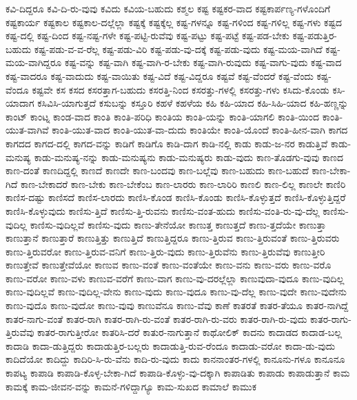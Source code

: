 {ಕವಿ-ದಿದ್ದರೂ
ಕವಿ-ದಿ-ರು-ವುವು
ಕವಿದು
ಕವಿಯ-ಬಹುದು
ಕಶ್ಮಲ
ಕಷ್ಟ
ಕಷ್ಟಕರ-ವಾದ
ಕಷ್ಟಕಾರ್ಪಣ್ಯ-ಗಳೊಂದಿಗೆ
ಕಷ್ಟಕಾರ್ಯ
ಕಷ್ಟಕಾಲ
ಕಷ್ಟಕಾಲ-ದಲ್ಲೆಲ್ಲಾ
ಕಷ್ಟಕ್ಕೆ
ಕಷ್ಟಕ್ಕೆಲ್ಲ
ಕಷ್ಟ-ಗಳನ್ನೂ
ಕಷ್ಟ-ಗಳಿಂದ
ಕಷ್ಟ-ಗಳಿಲ್ಲ
ಕಷ್ಟ-ಗಳು
ಕಷ್ಟದ
ಕಷ್ಟ-ದಲ್ಲಿ
ಕಷ್ಟ-ದಿಂದ
ಕಷ್ಟ-ನಷ್ಟ-ಗಳೇ
ಕಷ್ಟ-ಪಟ್ಟಿ-ರುವೆವು
ಕಷ್ಟ-ಪಟ್ಟು
ಕಷ್ಟ-ಪಟ್ಟೆ
ಕಷ್ಟ-ಪಡ-ಬೇಕು
ಕಷ್ಟ-ಪಡುತ್ತಿರ-ಬಹುದು
ಕಷ್ಟ-ಪಡು-ವ-ವ-ರೆಲ್ಲ
ಕಷ್ಟ-ಪಡು-ವಿರಿ
ಕಷ್ಟ-ಪಡು-ವು-ದಕ್ಕೆ
ಕಷ್ಟ-ಪಡು-ವುದು
ಕಷ್ಟ-ಮಯ-ವಾಗಿದೆ
ಕಷ್ಟ-ಮಯ-ವಾಗಿದ್ದರೂ
ಕಷ್ಟ-ವನ್ನು
ಕಷ್ಟ-ವಾಗಿ
ಕಷ್ಟ-ವಾಗಿ-ರ-ಬೇಕು
ಕಷ್ಟ-ವಾಗಿ-ರುವುದು
ಕಷ್ಟ-ವಾಗು-ವುದು
ಕಷ್ಟ-ವಾದ
ಕಷ್ಟ-ವಾದರೂ
ಕಷ್ಟ-ವಾದುದು
ಕಷ್ಟ-ವಾಯಿತು
ಕಷ್ಟ-ವಿದೆ
ಕಷ್ಟ-ವಿದ್ದರೂ
ಕಷ್ಟವೆ
ಕಷ್ಟ-ವೆಂದರೆ
ಕಷ್ಟ-ವೆಂದು
ಕಷ್ಟ-ವೆಂದೂ
ಕಷ್ಟವೇ
ಕಸ
ಕಸದ
ಕಸರತ್ತಾಗ-ಬಹುದು
ಕಸರತ್ತಿ-ನಿಂದ
ಕಸರತ್ತು-ಗಳಲ್ಲಿ
ಕಸರತ್ತು-ಗಳು
ಕಸಿದು-ಕೊಂಡು
ಕಸಿ-ಯಾದಾಗ
ಕಸಿವಿಸಿ-ಯಾಗುತ್ತದೆ
ಕಸುಬನ್ನು
ಕಸ್ತೂರಿ
ಕಹಳೆ
ಕಹಳೆಯ
ಕಹಿ
ಕಹಿ-ಯಾದ
ಕಹಿ-ಸಿಹಿ-ಯಾದ
ಕಹಿ-ಹಣ್ಣನ್ನು
ಕಾಂಟ್
ಕಾಂಟ್ನ
ಕಾಂಡ-ವಾದ
ಕಾಂತಿ
ಕಾಂತಿ-ಪರಿಧಿ
ಕಾಂತಿಯ
ಕಾಂತಿ-ಯನ್ನು
ಕಾಂತಿ-ಯಾಗಲಿ
ಕಾಂತಿ-ಯಿಂದ
ಕಾಂತಿ-ಯುತ-ವಾಗಿವೆ
ಕಾಂತಿ-ಯುತ-ವಾದ
ಕಾಂತಿ-ಯುತ-ವಾ-ದುದು
ಕಾಂತಿಯೇ
ಕಾಂತಿ-ಯೊಂದೆ
ಕಾಂತಿ-ಹೀನ-ವಾಗಿ
ಕಾಗದ
ಕಾಗದದ
ಕಾಗದ-ದಲ್ಲಿ
ಕಾಗದ-ವನ್ನು
ಕಾಡಿಗೆ
ಕಾಡಿಗೊ
ಕಾಡಿ-ದಾಗ
ಕಾಡಿ-ನಲ್ಲಿ
ಕಾಡು
ಕಾಡು-ಜ-ನರ
ಕಾಡುತ್ತಿವೆ
ಕಾಡು-ಮನುಷ್ಯ
ಕಾಡು-ಮನುಷ್ಯ-ನನ್ನು
ಕಾಡು-ಮನುಷ್ಯನು
ಕಾಡು-ಮನುಷ್ಯರು
ಕಾಡು-ವುದು
ಕಾಣ-ತೊಡಗು-ವುವು
ಕಾಣದ
ಕಾಣ-ದಂತೆ
ಕಾಣದಿದ್ದಲ್ಲಿ
ಕಾಣದೆ
ಕಾಣದೇ
ಕಾಣ-ಬಂದವು
ಕಾಣ-ಬಲ್ಲೆವು
ಕಾಣ-ಬಹುದು
ಕಾಣ-ಬಹುದೆ
ಕಾಣ-ಬೇಕಾ-ಗಿದೆ
ಕಾಣ-ಬೇಕಾದರೆ
ಕಾಣ-ಬೇಕು
ಕಾಣ-ಬೇಕೆಂಬ
ಕಾಣ-ಲಾರರು
ಕಾಣ-ಲಾರಿರಿ
ಕಾಣಲಿ
ಕಾಣ-ಲಿಲ್ಲ
ಕಾಣಲೇ
ಕಾಣಿರಿ
ಕಾಣಿಸ-ದಷ್ಟು
ಕಾಣಿಸದೆ
ಕಾಣಿಸ-ಲಾರದು
ಕಾಣಿಸಿ-ಕೊಂಡ
ಕಾಣಿಸಿ-ಕೊಂಡು
ಕಾಣಿಸಿ-ಕೊಳ್ಳುತ್ತದೆ
ಕಾಣಿಸಿ-ಕೊಳ್ಳುತ್ತಿದ್ದರೆ
ಕಾಣಿಸಿ-ಕೊಳ್ಳುವುದು
ಕಾಣಿಸು-ತ್ತಿದೆ
ಕಾಣಿಸು-ತ್ತಿ-ರುವನು
ಕಾಣಿಸು-ವಂತ-ಹುದು
ಕಾಣಿಸು-ವಂತಿ-ರು-ವು-ದೆಲ್ಲ
ಕಾಣಿಸು-ವುದಿಲ್ಲ
ಕಾಣಿಸು-ವುದಿಲ್ಲವೆ
ಕಾಣಿಸು-ವುದು
ಕಾಣು-ತೇನೆಯೋ
ಕಾಣುತ್ತ
ಕಾಣುತ್ತದೆ
ಕಾಣು-ತ್ತದೆಯೇ
ಕಾಣುತ್ತಾ
ಕಾಣುತ್ತಾನೆ
ಕಾಣುತ್ತಾರೆ
ಕಾಣುತ್ತಿತ್ತು
ಕಾಣುತ್ತಿದೆ
ಕಾಣುತ್ತಿದ್ದರೂ
ಕಾಣು-ತ್ತಿರುವ
ಕಾಣು-ತ್ತಿರುವಂತೆ
ಕಾಣು-ತ್ತಿರುವರು
ಕಾಣು-ತ್ತಿರುವರೋ
ಕಾಣು-ತ್ತಿರುವ-ವನಿಗೆ
ಕಾಣು-ತ್ತಿರು-ವುದು
ಕಾಣು-ತ್ತಿರುವೆನು
ಕಾಣು-ತ್ತಿರುವೆವು
ಕಾಣುತ್ತೀರಿ
ಕಾಣುತ್ತೇವೆ
ಕಾಣುತ್ತೇವೆಯೋ
ಕಾಣುವ
ಕಾಣು-ವಂತೆ
ಕಾಣು-ವಂತೆಯೇ
ಕಾಣು-ವನು
ಕಾಣು-ವರು
ಕಾಣು-ವರೊ
ಕಾಣು-ವರೋ
ಕಾಣು-ವಳು
ಕಾಣುವ-ವರೆಗೆ
ಕಾಣು-ವಾಗ
ಕಾಣು-ವು-ದರಲ್ಲೆಲ್ಲಾ
ಕಾಣುವುದಾ-ವುದೂ
ಕಾಣು-ವುದಿಲ್ಲ
ಕಾಣು-ವುದಿಲ್ಲವೆ
ಕಾಣು-ವುದಿಲ್ಲ-ವೇನು
ಕಾಣು-ವುದು
ಕಾಣು-ವುದೂ
ಕಾಣು-ವು-ದೆಲ್ಲ
ಕಾಣು-ವುದೇ
ಕಾಣು-ವುದೇನು
ಕಾಣು-ವುದೊ
ಕಾಣು-ವುದೋ
ಕಾಣು-ವುವು
ಕಾಣುವೆನೂ
ಕಾಣು-ವೆವು
ಕಾಣೆ
ಕಾತರತೆ
ಕಾತರ-ತೆಯೂ
ಕಾತರ-ನಾಗಿದ್ದೆ
ಕಾತರ-ನಾಗು-ವಂತೆ
ಕಾತರ-ರಾಗಿ
ಕಾತರ-ರಾಗಿ-ರು-ವಂತೆ
ಕಾತರ-ರಾಗಿ-ರು-ವರು
ಕಾತರ-ರಾಗಿ-ರು-ವುದು
ಕಾತರ-ರಾಗು-ತ್ತಿರುವೆವು
ಕಾತರ-ರಾಗುತ್ತೀರೋ
ಕಾತರಿಸಿ-ದರೆ
ಕಾತುರ-ನಾಗುತ್ತಾನೆ
ಕಾಥೋಲಿಕ್
ಕಾದನು
ಕಾದಾಡದ
ಕಾದಾಡ-ಬಲ್ಲ
ಕಾದಾಡಿ
ಕಾದಾ-ಡುತ್ತಿದ್ದರು
ಕಾದಾಡುತ್ತಿರ-ಬಲ್ಲರು
ಕಾದಾಡುತ್ತಿ-ರುವ-ರೆಂದೂ
ಕಾದಾಡು-ವರೋ
ಕಾದಾ-ಡು-ವುದು
ಕಾದಿದೆಯೋ
ಕಾದಿದ್ದು
ಕಾದಿರಿ-ಸಿ-ರು-ವೆನು
ಕಾದಿ-ರು-ವುದು
ಕಾದು
ಕಾನನಾಂತರ-ಗಳಲ್ಲಿ
ಕಾನೂನು-ಗಳೂ
ಕಾನೂನೂ
ಕಾಪಟ್ಯ
ಕಾಪಾಡಿ
ಕಾಪಾಡಿ-ಕೊಳ್ಳ-ಬೇಕಾ-ಗಿದೆ
ಕಾಪಾಡಿ-ಕೊಳ್ಳು-ವು-ದಕ್ಕಾಗಿ
ಕಾಪಾಡಿತು
ಕಾಪಾಡು
ಕಾಪಾಡುತ್ತಾನೆ
ಕಾಮ
ಕಾಮಕ್ಕೆ
ಕಾಮ-ಜೀವನ-ವನ್ನು
ಕಾಮನೆ-ಗಳಿದ್ದಾಗ್ಯೂ
ಕಾಮ-ಸುಖದ
ಕಾಮಾಲೆ
ಕಾಮುಕ
}
